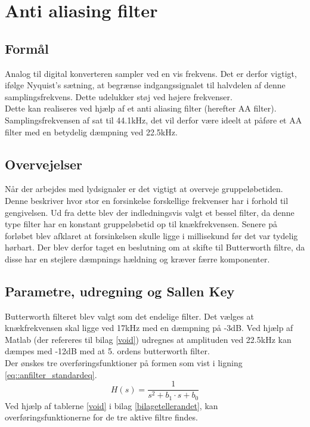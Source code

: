 
\section{Anti aliasing filter}
\subsection{Formål}
Analog til digital konverteren sampler ved en vis frekvens. Det er derfor vigtigt, ifølge Nyquist’s sætning, at begrænse indgangssignalet til halvdelen af denne samplingsfrekvens. Dette udelukker støj ved højere frekvenser.\\

Dette kan realiseres ved hjælp af et anti aliasing filter (herefter AA filter). Samplingsfrekvensen af sat til 44.1kHz, det vil derfor være ideelt at påføre et AA filter med en betydelig dæmpning ved 22.5kHz.\\
\subsection{Overvejelser}
Når der arbejdes med lydsignaler er det vigtigt at overveje gruppeløbetiden. Denne beskriver hvor stor en forsinkelse forskellige frekvenser har i forhold til gengivelsen. Ud fra dette blev der indledningsvis valgt et bessel filter, da denne type filter har en konstant gruppeløbetid op til knækfrekvensen. Senere på forløbet blev afklaret at forsinkelsen skulle ligge i millisekund før det var tydelig hørbart. Der blev derfor taget en beslutning om at skifte til Butterworth filtre, da disse har en stejlere dæmpnings hældning og kræver færre komponenter.\\
\subsection{Parametre, udregning og Sallen Key}\label{sec::anfilter_sallenpara}
Butterworth filteret blev valgt som det endelige filter. 
Det vælges at knækfrekvensen skal ligge ved 17kHz med en dæmpning på -3dB. Ved hjælp af Matlab (der refereres til bilag \ref{void}) udregnes at amplituden ved 22.5kHz kan dæmpes med -12dB med at 5. ordens butterworth filter.\\
Der ønskes tre overføringsfunktioner på formen som vist i ligning \ref{eq::anfilter_standardeq}.
\begin{equation}
	H(s) = \dfrac{1}{s^2+b_1\cdot s + b_0}\label{eq::anfilter_standardeq}
\end{equation}
Ved hjælp af tablerne \ref{void} i bilag \ref{bilagetellerandet}, kan overføringsfunktionerne for de tre aktive filtre findes.

